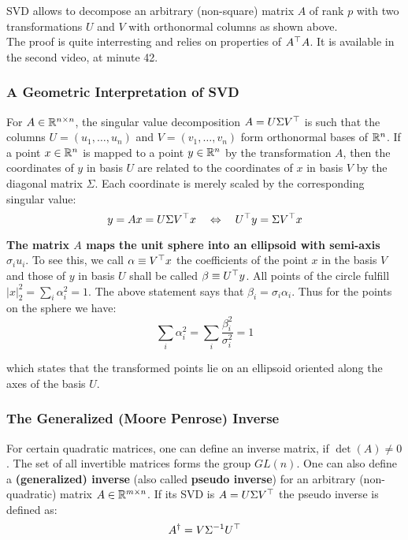 \noindent
SVD allows to decompose an arbitrary (non-square) matrix $A$
of rank $p$ with two transformations $U$ and $V$ with orthonormal
columns as shown above.\\

\noindent
The proof is quite interresting and relies on properties of $A^{\top}A$.
It is available in the second video, at minute 42.


\subsubsection{A Geometric Interpretation of SVD}
\label{ssub:a_geometric_interpretation_of_svd}

For $A \in \mathbb{R}^{n \times{} n}$, the singular value decomposition
$A = U \Sigma V^{\top}$ is such that the columns $U = (u_1, \ldots, u_n)$
and $V = (v_1, \ldots, v_n)$ form orthonormal bases of $\mathbb{R}^n$.
If a point $x \in \mathbb{R}^n$ is mapped to a point $y \in \mathbb{R}^n$
by the transformation $A$, then the coordinates of $y$ in basis $U$
are related to the coordinates of $x$ in basis $V$
by the diagonal matrix $\Sigma$. Each coordinate is merely scaled by
the corresponding singular value:
\[y = Ax = U\Sigma V^{\top}x \quad \Leftrightarrow \quad U^{\top}y = \Sigma V^{\top}x\]

\noindent
\textbf{The matrix $A$ maps the unit sphere into an ellipsoid with
semi-axis $\sigma_i u_i$}. To see this, we call $\alpha \equiv V^{\top}x$
the coefficients of the point $x$ in the basis $V$ and those of $y$
in basis $U$ shall be called $\beta \equiv U^{\top}y$.
All points of the circle fulfill $|x|^2_2 = \sum_i\alpha^2_i = 1$.
The above statement says that $\beta_i = \sigma_i\alpha_i$.
Thus for the points on the sphere we have:
	\[\sum_i\alpha^2_i = \sum_i\frac{\beta^2_i}{\sigma^2_i} = 1\]

\noindent
which states that the transformed points lie on an ellipsoid
oriented along the axes of the basis $U$.


\subsubsection{The Generalized (Moore Penrose) Inverse}
\label{ssub:the_generalized_moore_penrose_inverse}

For certain quadratic matrices, one can define an inverse matrix, if $\det(A) \ne 0$.
The set of all invertible matrices forms the group $GL(n)$.
One can also define a \textbf{(generalized) inverse}
(also called \textbf{pseudo inverse}) for an arbitrary (non-quadratic)
matrix $A \in \mathbb{R}^{m \times{} n}$. If its SVD is $A = U \Sigma V^{\top}$
the pseudo inverse is defined as:
	\[A^{\dagger} = V \Sigma^{-1} U^{\top}\]

